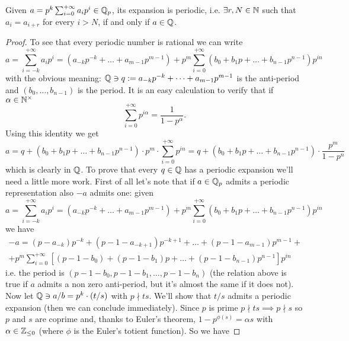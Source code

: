 		\begin{lemma}
			\label{lemma:Q-in-Qp}
			Given $a = p^k \sum_{i=0}^{+\infty} a_ip^i \in \mathbb{Q}_p$, its \padic expansion is periodic, i.e. $\exists r, N \in \mathbb{N}$ such that $a_i = a_{i+r}$ for every $i > N$, if and only if $a \in \mathbb{Q}$.
		\end{lemma}
		\begin{proof}
	 	To see that every periodic \padic number is rational we can write
			\begin{equation*}
			a = \sum_{i=-k}^{+\infty} a_ip^i = (a_{-k}p^{-k} + \dots + a_{m-1}p^{m-1}) + p^m\sum_{i=0}^{+\infty} (b_0 + b_1p + \dots + b_{n-1}p^{n-1})p^{in}
			\end{equation*}
			with the obvious meaning: $\mathbb{Q} \ni q := a_{-k}p^{-k} + \dots + a_{m-1}p^{m-1}$ is the anti-period and $(b_0, \dots, b_{n-1})$ is the period. It is an easy calculation to verify that if $\alpha \in \mathbb{N}^{\times}$
			\begin{equation*}
			\sum_{i=0}^{+\infty} p^{i\alpha} = \frac{1}{1 - p^\alpha}.
			\end{equation*}
			Using this identity we get
			\begin{equation*}
				a = q + (b_0 + b_1p + \dots + b_{n-1}p^{n-1})\cdot p^m \cdot \sum_{i=0}^{+\infty} p^{in} = q + (b_0 + b_1p + \dots + b_{n-1}p^{n-1})\cdot\frac{p^m}{1 - p^n}
			\end{equation*}
			which is clearly in $\mathbb{Q}$.\newline
			To prove that every $q \in \mathbb{Q}$ has a periodic \padic expansion we'll need a little more work. First of all let's note that if $a \in \mathbb{Q}_p$ admits a periodic representation also $-a$ admits one: given
			\begin{equation*}
				a = \sum_{i=-k}^{+\infty} a_ip^i = (a_{-k}p^{-k} + \dots + a_{m-1}p^{m-1}) + p^m\sum_{i=0}^{+\infty} (b_0 + b_1p + \dots + b_{n-1}p^{n-1})p^{in}
			\end{equation*}
			we have 
			\begin{gather*}
				-a = (p - a_{-k})p^{-k} + (p - 1 - a_{-k+1})p^{-k+1} +  \dots + (p - 1 - a_{m-1})p^{m-1} +\\
				+ p^m\sum_{i=0}^{+\infty} \left[(p - 1 - b_0) + (p - 1 - b_1)p + \dots + (p - 1 - b_{n-1})p^{n-1}\right]p^{in}
			\end{gather*}
			i.e. the period is $(p-1-b_0, p-1-b_1, \dots, p-1-b_n)$ (the relation above is true if $a$ admits a non zero anti-period, but it's almost the same if it does not).\newline
			Now let $\mathbb{Q} \ni a/b = p^k\cdot(t/s)$ with $p \nmid ts$. We'll show that $t/s$ admits a periodic expansion (then we can conclude immediately). Since $p$ is prime $p \nmid ts \implies p \nmid s$ so $p$ and $s$ are coprime and, thanks to Euler's theorem, $1 - p^{\phi(s)} = \alpha s$ with $\alpha \in \mathbb{Z}_{\leq0}$ (where $\phi$ is the Euler's totient function). So we have

\end{proof}
